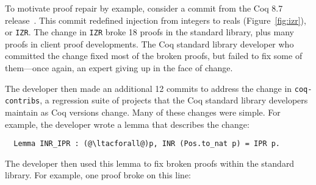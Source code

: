\begin{figure*}
\begin{minipage}{0.55\textwidth}
\centering
\lstset{language=coq, aboveskip=0pt, belowskip=0pt}



\end{minipage}
\hfill
\begin{minipage}{0.44\textwidth}
\centering
\lstset{language=coq, aboveskip=0pt, belowskip=0pt}



\end{minipage}
\caption[Caption]{Old (left) and new (right) definitions of \lstinline{IZR} in Coq.
The old definition applies injection from naturals to reals and conversion of positives to
naturals; the new definition applies injection from positives to reals.
In contrast with most terms shown in this thesis,
this term uses pattern matching and recursion rather than .}
\label{fig:izr}
\end{figure*}

To motivate proof repair by example, consider a commit from the Coq 8.7 release~\cite{coq87commit}.
This commit redefined injection from integers to reals (Figure~\ref{fig:izr}), or \lstinline{IZR}.
The change in \lstinline{IZR} broke 18 proofs in the standard library, plus many proofs in
client proof developments.
The Coq standard library developer who committed the change fixed most of the broken proofs,
but failed to fix some of them---once again, an expert giving up in the face of change.

The developer then made an additional 12 commits to address the change in \lstinline{coq-contribs},
a regression suite of projects that the Coq standard library developers maintain as Coq versions change.
Many of these changes were simple. For example, the developer wrote a lemma that describes the change:

\lstset{language=coq, aboveskip=3pt, belowskip=3pt}
\begin{lstlisting}
  Lemma INR_IPR : (@\ltacforall@)p, INR (Pos.to_nat p) = IPR p.
\end{lstlisting}
The developer then used this lemma to fix broken proofs within the standard library. 
For example, one proof broke on this line:

